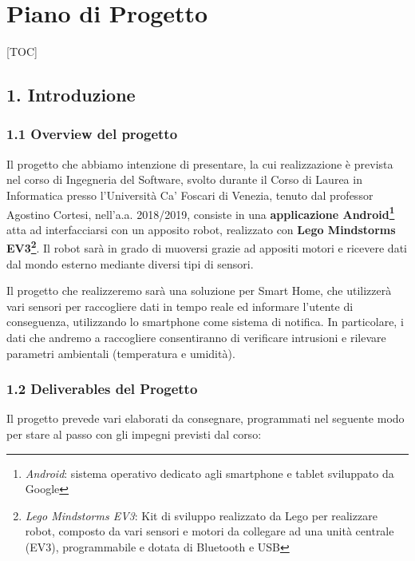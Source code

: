 \documentclass[]{article}
\date{}
\begin{document}
\hypertarget{piano-di-progetto}{%
\section{Piano di Progetto}\label{piano-di-progetto}}

{[}TOC{]}

\hypertarget{introduzione}{%
\subsection{1. Introduzione}\label{introduzione}}

\hypertarget{overview-del-progetto}{%
\subsubsection{1.1 Overview del progetto}\label{overview-del-progetto}}

Il progetto che abbiamo intenzione di presentare, la cui realizzazione è
prevista nel corso di Ingegneria del Software, svolto durante il Corso
di Laurea in Informatica presso l'Università Ca' Foscari di Venezia,
tenuto dal professor Agostino Cortesi, nell'a.a. 2018/2019, consiste in
una \textbf{applicazione Android\footnote{\emph{Android}: sistema
  operativo dedicato agli smartphone e tablet sviluppato da Google}}
atta ad interfacciarsi con un apposito robot, realizzato con
\textbf{Lego Mindstorms EV3\footnote{\emph{Lego Mindstorms EV3}: Kit di
  sviluppo realizzato da Lego per realizzare robot, composto da vari
  sensori e motori da collegare ad una unità centrale (EV3),
  programmabile e dotata di Bluetooth e USB}}. Il robot sarà in grado di
muoversi grazie ad appositi motori e ricevere dati dal mondo esterno
mediante diversi tipi di sensori.

Il progetto che realizzeremo sarà una soluzione per Smart Home, che
utilizzerà vari sensori per raccogliere dati in tempo reale ed informare
l'utente di conseguenza, utilizzando lo smartphone come sistema di
notifica. In particolare, i dati che andremo a raccogliere consentiranno
di verificare intrusioni e rilevare parametri ambientali (temperatura e
umidità).

\hypertarget{deliverables-del-progetto}{%
\subsubsection{1.2 Deliverables del
Progetto}\label{deliverables-del-progetto}}

Il progetto prevede vari elaborati da consegnare, programmati nel
seguente modo per stare al passo con gli impegni previsti dal corso:
\end{document}
